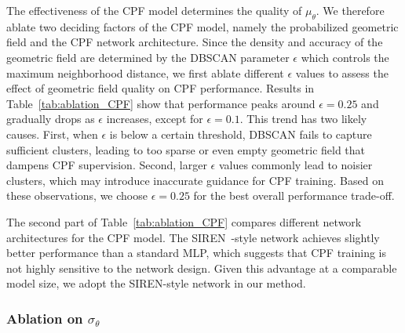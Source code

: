 \documentclass[lettersize,journal]{IEEEtran}
\begin{document}
The effectiveness of the CPF model determines the quality of $\mu_{\theta}$. 
We therefore ablate two deciding factors of the CPF model, 
namely the probabilized geometric field and the CPF network architecture.
Since the density and accuracy of the geometric field are determined by the DBSCAN parameter $\epsilon$ which controls the maximum neighborhood distance, we first ablate different $\epsilon$ values to assess the effect of geometric field quality on CPF performance.
Results in Table~\ref{tab:ablation_CPF} show that performance peaks around $\epsilon = 0.25$ and gradually drops as $\epsilon$ increases, except for $\epsilon = 0.1$.
This trend has two likely causes.
First, when $\epsilon$ is below a certain threshold, DBSCAN fails to capture sufficient clusters, leading to too sparse or even empty geometric field that dampens CPF supervision.
Second, larger $\epsilon$ values commonly lead to noisier clusters, which may introduce inaccurate guidance for CPF training. 
Based on these observations, we choose $\epsilon = 0.25$ for the best overall performance trade-off.

The second part of Table~\ref{tab:ablation_CPF} compares different network architectures for the CPF model. 
The SIREN~\cite{implicit}-style network achieves slightly better performance than a standard MLP, which suggests that CPF training is not highly sensitive to the network design. 
Given this advantage at a comparable model size, we adopt the SIREN-style network in our method.


\subsubsection{Ablation on \texorpdfstring{$\sigma_{\theta}$}{sigma-theta}}
\end{document}
